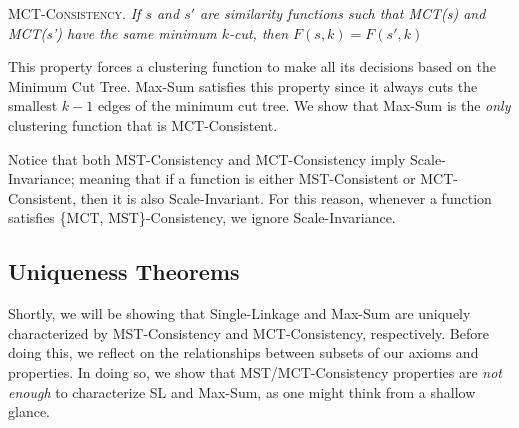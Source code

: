 \documentclass[twoside,11pt]{article}
\begin{document}
\begin{center}
\textsc{MCT-Consistency.} \textit{If $s$ and $s'$ are similarity functions such that MCT(s) and MCT(s') have the same minimum $k$-cut, then $F(s,k) = F(s',k)$}
\end{center}

This property forces a clustering function to make all its decisions based on the Minimum Cut Tree. Max-Sum satisfies this property since it always cuts the smallest $k-1$ edges of the minimum cut tree. We show that Max-Sum is the \textit{only} clustering function that is MCT-Consistent.

Notice that both MST-Consistency and MCT-Consistency imply Scale-Invariance; meaning that if a function is either MST-Consistent or MCT-Consistent, then it is also Scale-Invariant. For this reason, whenever a function satisfies \{MCT, MST\}-Consistency, we ignore Scale-Invariance.

\subsection{Uniqueness Theorems}

Shortly, we will be showing that Single-Linkage and Max-Sum are uniquely characterized by MST-Consistency and MCT-Consistency, respectively. Before doing this, we reflect on the relationships between subsets of our axioms and properties. In doing so, we show that MST/MCT-Consistency properties are \textit{not enough} to characterize SL and Max-Sum, as one might think from a shallow glance. 
\end{document}

